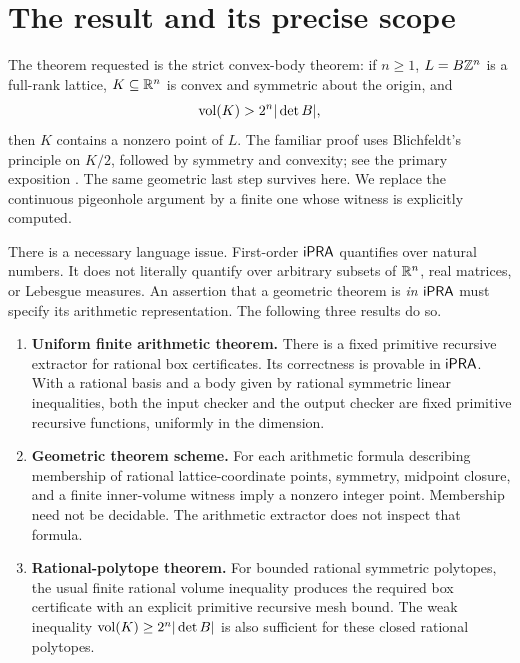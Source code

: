 \section{The result and its precise scope}\label{sec:scope}

The theorem requested is the strict convex-body theorem:
if \(n\geq1\), \(L=B\mathbb Z^n\) is a full-rank lattice, \(K\subseteq\mathbb R^n\)
is convex and symmetric about the origin, and
\begin{equation}\label{eq:classical}
   \operatorname{vol}(K)>2^n|\det B|,
\end{equation}
then \(K\) contains a nonzero point of \(L\).
The familiar proof uses Blichfeldt's principle on \(K/2\), followed by
symmetry and convexity; see the primary exposition \cite{gorodnik}.
The same geometric last step survives here. We replace the continuous
pigeonhole argument by a finite one whose witness is explicitly computed.

There is a necessary language issue. First-order \(\mathsf{iPRA}\) quantifies
over natural numbers. It does not literally quantify over arbitrary
subsets of \(\mathbb R^n\), real matrices, or Lebesgue measures. An assertion
that a geometric theorem is \emph{in \(\mathsf{iPRA}\)} must specify its arithmetic
representation. The following three results do so.

\begin{enumerate}
\item \textbf{Uniform finite arithmetic theorem.}
There is a fixed primitive recursive extractor for rational box
certificates. Its correctness is provable in \(\mathsf{iPRA}\). With a rational
basis and a body given by rational symmetric linear inequalities, both
the input checker and the output checker are fixed primitive recursive
functions, uniformly in the dimension.
\item \textbf{Geometric theorem scheme.}
For each arithmetic formula describing membership of rational
lattice-coordinate points, symmetry, midpoint closure, and a finite
inner-volume witness imply a nonzero integer point. Membership need not
be decidable. The arithmetic extractor does not inspect that formula.
\item \textbf{Rational-polytope theorem.}
For bounded rational symmetric polytopes, the usual finite rational
volume inequality produces the required box certificate with an
explicit primitive recursive mesh bound. The weak inequality
\(\operatorname{vol}(K)\geq2^n|\det B|\) is also sufficient for these closed rational
polytopes.
\end{enumerate}


